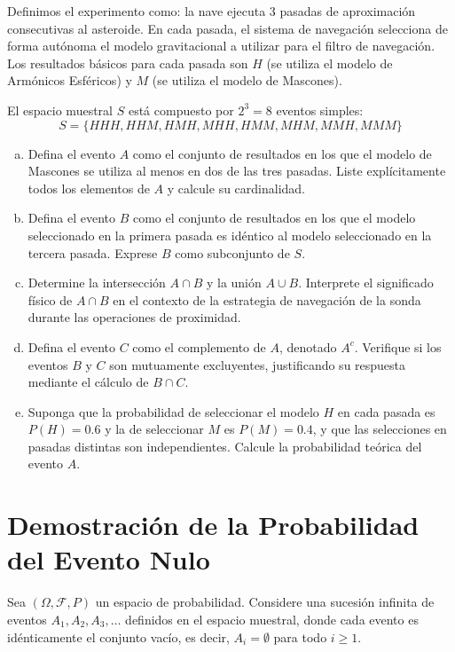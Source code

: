\documentclass[a4paper]{article}
\begin{document}
Definimos el experimento como: la nave ejecuta 3 pasadas de aproximación consecutivas al asteroide. En cada pasada, el sistema de navegación selecciona de forma autónoma el modelo gravitacional a utilizar para el filtro de navegación. Los resultados básicos para cada pasada son $H$ (se utiliza el modelo de Armónicos Esféricos) y $M$ (se utiliza el modelo de Mascones).



El espacio muestral $S$ está compuesto por $2^3 = 8$ eventos simples:
$$
S = \{HHH, HHM, HMH, MHH, HMM, MHM, MMH, MMM\}
$$

\begin{enumerate}[a)]
\item Defina el evento $A$ como el conjunto de resultados en los que el modelo de Mascones se utiliza al menos en dos de las tres pasadas. Liste explícitamente todos los elementos de $A$ y calcule su cardinalidad.
\item Defina el evento $B$ como el conjunto de resultados en los que el modelo seleccionado en la primera pasada es idéntico al modelo seleccionado en la tercera pasada. Exprese $B$ como subconjunto de $S$.
\item Determine la intersección $A \cap B$ y la unión $A \cup B$. Interprete el significado físico de $A \cap B$ en el contexto de la estrategia de navegación de la sonda durante las operaciones de proximidad.
\item Defina el evento $C$ como el complemento de $A$, denotado $A^c$. Verifique si los eventos $B$ y $C$ son mutuamente excluyentes, justificando su respuesta mediante el cálculo de $B \cap C$.
\item Suponga que la probabilidad de seleccionar el modelo $H$ en cada pasada es $P(H) = 0.6$ y la de seleccionar $M$ es $P(M) = 0.4$, y que las selecciones en pasadas distintas son independientes. Calcule la probabilidad teórica del evento $A$.
\end{enumerate}


\section{Demostración de la Probabilidad del Evento Nulo}
\label{sec:problema-07}

Sea $(\Omega, \mathcal{F}, P)$ un espacio de probabilidad. Considere una sucesión infinita de eventos $A_1, A_2, A_3, \dots$ definidos en el espacio muestral, donde cada evento es idénticamente el conjunto vacío, es decir, $A_i = \emptyset$ para todo $i \geq 1$.
\end{document}
